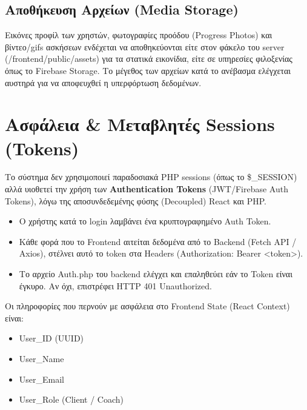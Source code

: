 \documentclass[12pt,a4paper]{report}
\begin{document}
\subsection{Αποθήκευση Αρχείων (Media Storage)}
Εικόνες προφίλ των χρηστών, φωτογραφίες προόδου (Progress Photos) και βίντεο/gifs ασκήσεων ενδέχεται να αποθηκεύονται είτε στον φάκελο του server (\textenglish{/frontend/public/assets}) για τα στατικά εικονίδια, είτε σε υπηρεσίες φιλοξενίας όπως το Firebase Storage. Το μέγεθος των αρχείων κατά το ανέβασμα ελέγχεται αυστηρά για να αποφευχθεί η υπερφόρτωση δεδομένων.

\newpage

\section{Ασφάλεια \& Μεταβλητές Sessions (Tokens)}
Το σύστημα δεν χρησιμοποιεί παραδοσιακά PHP sessions (όπως το \textenglish{\$\_SESSION}) αλλά υιοθετεί την χρήση των \textbf{Authentication Tokens} (JWT/Firebase Auth Tokens), λόγω της αποσυνδεδεμένης φύσης (Decoupled) React και PHP.

\begin{itemize}[label=•]
    \item Ο χρήστης κατά το login λαμβάνει ένα κρυπτογραφημένο Auth Token.
    \item Κάθε φορά που το Frontend αιτείται δεδομένα από το Backend (\textenglish{Fetch API / Axios}), στέλνει αυτό το token στα Headers (\textenglish{Authorization: Bearer <token>}).
    \item Το αρχείο \textenglish{Auth.php} του backend ελέγχει και επαληθεύει εάν το Token είναι έγκυρο. Αν όχι, επιστρέφει \textenglish{HTTP 401 Unauthorized}.
\end{itemize}

Οι πληροφορίες που περνούν με ασφάλεια στο Frontend State (React Context) είναι:
\begin{itemize}[label=•]
    \item \textenglish{User\_ID (UUID)}
    \item \textenglish{User\_Name}
    \item \textenglish{User\_Email}
    \item \textenglish{User\_Role (Client / Coach)}
\end{itemize}
\end{document}

